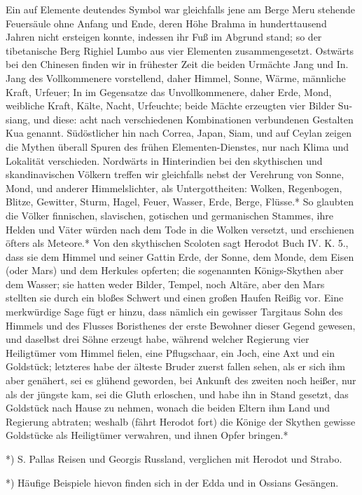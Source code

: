 \documentclass[a4paper, 11pt, oneside, polutonikogreek, german]{article}
\begin{document}
Ein auf Elemente deutendes Symbol war gleichfalls jene am Berge Meru stehende Feuersäule ohne Anfang und Ende, deren Höhe Brahma in hunderttausend Jahren nicht ersteigen konnte, indessen ihr Fuß im Abgrund stand; so der tibetanische Berg Righiel Lumbo aus vier Elementen zusammengesetzt. Ostwärts bei den Chinesen finden wir in frühester Zeit die beiden Urmächte Jang und In. Jang des Vollkommenere vorstellend, daher Himmel, Sonne, Wärme, männliche Kraft, Urfeuer; In im Gegensatze das Unvollkommenere, daher Erde, Mond, weibliche Kraft, Kälte, Nacht, Urfeuchte; beide Mächte erzeugten vier Bilder Su-siang, und diese: acht nach verschiedenen Kombinationen verbundenen Gestalten Kua genannt. Südöstlicher hin nach Correa, Japan, Siam, und auf Ceylan zeigen die Mythen überall Spuren des frühen Elementen-Dienstes, nur nach Klima und Lokalität verschieden. Nordwärts in Hinterindien bei den skythischen und skandinavischen Völkern treffen wir gleichfalls nebst der Verehrung von Sonne, Mond, und anderer Himmelslichter, als Untergottheiten: Wolken, Regenbogen, Blitze, Gewitter, Sturm, Hagel, Feuer, Wasser, Erde, Berge, Flüsse.* So glaubten die Völker finnischen, slavischen, gotischen und germanischen Stammes, ihre Helden und Väter würden nach dem Tode in die Wolken versetzt, und erschienen öfters als Meteore.* Von den skythischen Scoloten sagt Herodot Buch IV. K. 5., dass sie dem Himmel und seiner Gattin Erde, der Sonne, dem Monde, dem Eisen (oder Mars) und dem Herkules opferten; die sogenannten Königs-Skythen aber dem Wasser; sie hatten weder Bilder, Tempel, noch Altäre, aber den Mars stellten sie durch ein bloßes Schwert und einen großen Haufen Reißig vor. Eine merkwürdige Sage fügt er hinzu, dass nämlich ein gewisser Targitaus Sohn des Himmels und des Flusses Boristhenes der erste Bewohner dieser Gegend gewesen, und daselbst drei Söhne erzeugt habe, während welcher Regierung vier Heiligtümer vom Himmel fielen, eine Pflugschaar, ein Joch, eine Axt und ein Goldstück; letzteres habe der älteste Bruder zuerst fallen sehen, als er sich ihm aber genähert, sei es glühend geworden, bei Ankunft des zweiten noch heißer, nur als der jüngste kam, sei die Gluth erloschen, und habe ihn in Stand gesetzt, das Goldstück nach Hause zu nehmen, wonach die beiden Eltern ihm Land und Regierung abtraten; weshalb (fährt Herodot fort) die Könige der Skythen gewisse Goldstücke als Heiligtümer verwahren, und ihnen Opfer bringen.*

*) S. Pallas Reisen und Georgis Russland, verglichen mit Herodot und Strabo.

*) Häufige Beispiele hievon finden sich in der Edda und in Ossians Gesängen.
\end{document}
